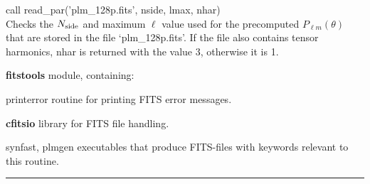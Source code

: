 \begin{example}
{
call read\_par('plm\_128p.fits', nside, lmax, nhar)  \\
}
{
Checks the $N_\mathrm{side}$ and maximum $\ell$ value used for the precomputed $P_{\ell
  m}(\theta)$ that are stored in the file `plm\_128p.fits'. If the file also contains tensor harmonics, nhar is returned with the value 3, otherwise it is 1.
}
\end{example}
\begin{modules}
  \begin{sulist}{} %
  \item[\textbf{fitstools}] module, containing:
  \item[printerror] routine for printing FITS error messages.
  \item[\textbf{cfitsio}] library for FITS file handling.		
  \end{sulist}
\end{modules}

\begin{related}
  \begin{sulist}{} %
  \item[synfast, plmgen] executables that produce FITS-files with keywords relevant to this routine.
  \end{sulist}
\end{related}

\rule{\hsize}{2mm}

\newpage
